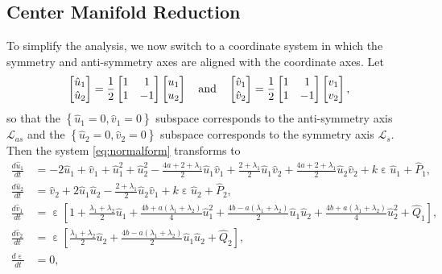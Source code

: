 \documentclass[10pt,onecolumn]{article}
\theoremstyle{plain}
\DeclareMathOperator{\eps}{\varepsilon}
\begin{document}
\subsection{Center Manifold Reduction} \label{subsec:cmreduction}
To simplify the analysis, we now switch to a coordinate system in which the symmetry and anti-symmetry axes are aligned with the coordinate axes. Let
%
\[ \begin{bmatrix} \hat u_1 \\ \hat u_2 \end{bmatrix} = \frac{1}{2} \begin{bmatrix} 1 & 1 \\ 1 & -1  \end{bmatrix} \begin{bmatrix} u_1 \\ u_2 \end{bmatrix} \quad {\rm and } \quad \begin{bmatrix} \hat v_1 \\ \hat v_2 \end{bmatrix} = \frac{1}{2} \begin{bmatrix} 1 & 1 \\ 1 & -1 \end{bmatrix} \begin{bmatrix} v_1 \\ v_2 \end{bmatrix}, \]
%
so that the $\left\{ \hat u_1 = 0, \hat v_1 = 0 \right\}$ subspace corresponds to the anti-symmetry axis $\mathcal L_{as}$ and the $\left\{ \hat u_2 = 0, \hat v_2 = 0 \right\}$ subspace corresponds to the symmetry axis $\mathcal L_s$.
Then the system \eqref{eq:normalform} transforms to 
%
\begin{equation} \label{eq:nfsymasym}
  \begin{split}
    \frac{d\hat u_1}{dt} &= -2\hat u_1 + \hat v_1 + \hat u_1^2+\hat u_2^2 - \tfrac{4a+2+\lambda_1}{2} \hat u_1 \hat v_1 + \tfrac{2+\lambda_1}{2}\hat u_1 \hat v_2+\tfrac{4a+2+\lambda_1}{2} \hat u_2 \hat v_2 + k \eps \hat u_1 + \hat P_1, \\
    \frac{d\hat u_2}{dt} &= \hat v_2+2 \hat u_1 \hat u_2-\tfrac{2+\lambda_1}{2} \hat u_2 \hat v_1+k \eps \hat u_2 + \hat P_2, \\
    \frac{d\hat v_1}{dt} &= \eps \left[ 1+\tfrac{\lambda_1+\lambda_2}{2} \hat u_1 + \tfrac{4b+a(\lambda_1+\lambda_2)}{4} \hat u_1^2 + \tfrac{4b-a(\lambda_1+\lambda_2)}{2} \hat u_1 \hat u_2 + \tfrac{4b+a(\lambda_1+\lambda_2)}{4} \hat u_2^2 + \hat Q_1 \right], \\
    \frac{d\hat v_2}{dt} &= \eps \left[ \tfrac{\lambda_1+\lambda_2}{2} \hat u_2 +\tfrac{4b-a(\lambda_1+\lambda_2)}{2} \hat u_1 \hat u_2 + \hat Q_2 \right], \\
    \frac{d\eps}{dt} &= 0,
  \end{split}
\end{equation}
\end{document}
